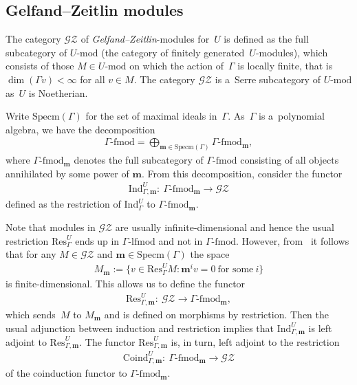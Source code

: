 \documentclass[11pt]{article}
\newcommand{\dash}[1]{\text{-}\mathrm{#1}}
\begin{document}
\subsection{Gelfand--Zeitlin modules}%

The category $\mathscr{G}\mathscr{Z}$ of {\em Gelfand--Zeitlin}-modules for~$U$ is def\/ined as the full subcategory of
$U\dash{mod}$ (the category of f\/initely generated~$U$-modules), which consists of those $M\in U\dash{mod}$ on which the
action of~$\Gamma$ is locally f\/inite, that is $\dim(\Gamma v)<\infty$ for all $v\in M$.
The category $\mathscr{G}\mathscr{Z}$ is a~Serre subcategory of $U\dash{mod}$ as~$U$ is Noetherian.

Write $\mathrm{Specm}(\Gamma)$ for the set of maximal ideals in~$\Gamma$.
As~$\Gamma$ is a~polynomial algebra, we have the decomposition
\begin{gather*}
\Gamma\dash{fmod}=\bigoplus_{\mathbf{m}\in\mathrm{Specm}(\Gamma)} \Gamma\dash{fmod}_{\mathbf{m}},
\end{gather*}
where $\Gamma\dash{fmod}_{\mathbf{m}}$ denotes the full subcategory of $\Gamma\dash{fmod}$ consisting of all objects
annihilated by some power of $\mathbf{m}$.
From this decomposition, consider the functor
\begin{gather*}
\mathrm{Ind}_{\Gamma,\mathbf{m}}^U: \ \Gamma\dash{fmod}_{\mathbf{m}}\to \mathscr{G}\mathscr{Z}
\end{gather*}
def\/ined as the restriction of $\mathrm{Ind}_{\Gamma}^U$ to $\Gamma\dash{fmod}_{\mathbf{m}}$.

Note that modules in $\mathscr{G}\mathscr{Z}$ are usually inf\/inite-dimensional and hence the usual restriction
$\mathrm{Res}_{\Gamma}^U$ ends up in $\Gamma\dash{lfmod}$ and not in $\Gamma\dash{fmod}$.
However, from~\cite[Corollary~5.3(a)]{FuOv2} it follows that for any $M\in \mathscr{G}\mathscr{Z}$ and
$\mathbf{m}\in\mathrm{Specm}(\Gamma)$ the space
\begin{gather*}
M_{\mathbf{m}}:=\big\{v\in \mathrm{Res}_{\Gamma}^U M: \mathbf{m}^iv=0~\text{for some}~i\big\}
\end{gather*}
is f\/inite-dimensional.
This allows us to def\/ine the functor
\begin{gather*}
\mathrm{Res}_{\Gamma,\mathbf{m}}^U: \ \mathscr{G}\mathscr{Z}\to \Gamma\dash{fmod}_{\mathbf{m}},
\end{gather*}
which sends~$M$ to $M_{\mathbf{m}}$ and is def\/ined on morphisms by restriction.
Then the usual adjunction between induction and restriction implies that $\mathrm{Ind}_{\Gamma,\mathbf{m}}^U$ is left
adjoint to $\mathrm{Res}_{\Gamma,\mathbf{m}}^U$.
The functor $\mathrm{Res}_{\Gamma,\mathbf{m}}^U$ is, in turn, left adjoint to the restriction
\begin{gather*}
\mathrm{Coind}_{\Gamma,\mathbf{m}}^U: \ \Gamma\dash{fmod}_{\mathbf{m}}\to \mathscr{G}\mathscr{Z}
\end{gather*}
of the coinduction functor to $\Gamma\dash{fmod}_{\mathbf{m}}$.
\end{document}
